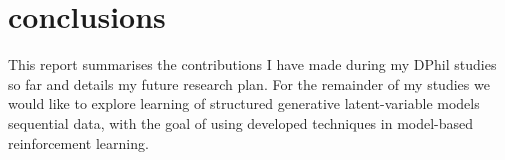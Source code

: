 \section{conclusions}
\label{sec:conclusions}

    This report summarises the contributions I have made during my DPhil studies so far and details my future research plan. For the remainder of my studies we would like to explore learning of structured generative latent-variable models sequential data, with the goal of using developed techniques in model-based reinforcement learning.